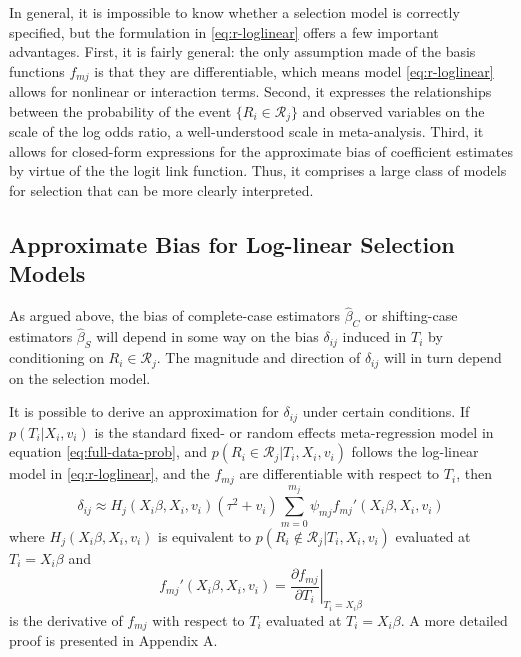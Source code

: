 \documentclass[
]{article}
\begin{document}
In general, it is impossible to know whether a selection model is correctly specified, but the formulation in \eqref{eq:r-loglinear} offers a few important advantages.
First, it is fairly general: the only assumption made of the basis functions \(f_{mj}\) is that they are differentiable, which means model \eqref{eq:r-loglinear} allows for nonlinear or interaction terms.
Second, it expresses the relationships between the probability of the event \(\{R_i \in \mathcal{R}_j\}\) and observed variables on the scale of the log odds ratio, a well-understood scale in meta-analysis.
Third, it allows for closed-form expressions for the approximate bias of coefficient estimates by virtue of the the logit link function.
Thus, it comprises a large class of models for selection that can be more clearly interpreted.

\hypertarget{approximate-bias-for-log-linear-selection-models}{%
\subsection{Approximate Bias for Log-linear Selection Models}\label{approximate-bias-for-log-linear-selection-models}}

As argued above, the bias of complete-case estimators \(\hat{\beta}_C\) or shifting-case estimators \(\hat{\beta}_S\) will depend in some way on the bias \(\delta_{ij}\) induced in \(T_i\) by conditioning on \(R_i \in \mathcal{R}_j\).
The magnitude and direction of \(\delta_{ij}\) will in turn depend on the selection model.

It is possible to derive an approximation for \(\delta_{ij}\) under certain conditions.
If \(p(T_i | X_i, v_i)\) is the standard fixed- or random effects meta-regression model in equation \eqref{eq:full-data-prob}, and \(p(R_i \in \mathcal{R}_j | T_i, X_i, v_i)\) follows the log-linear model in \eqref{eq:r-loglinear}, and the \(f_{mj}\) are differentiable with respect to \(T_i\), then
\begin{equation}
\delta_{ij} \approx H_j(X_i \beta, X_i, v_i)(\tau^2 + v_i)\sum_{m = 0}^{m_j} \psi_{mj} f_{mj}'(X_i \beta, X_i, v_i)
\label{eq:conditional-bias}
\end{equation}
where \(H_j(X_i \beta, X_i, v_i)\) is equivalent to \(p(R_i \not\in \mathcal{R}_j | T_i, X_i, v_i)\) evaluated at \(T_i = X_i\beta\) and
\[
f_{mj}'(X_i\beta, X_i, v_i) = \left.\frac{\partial f_{mj}}{\partial T_i}\right\rvert_{T_i = X_i\beta}
\]
is the derivative of \(f_{mj}\) with respect to \(T_i\) evaluated at \(T_i = X_i\beta\).
A more detailed proof is presented in Appendix A.
\end{document}
